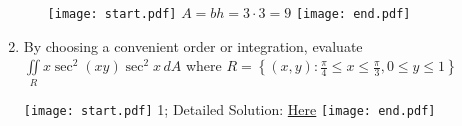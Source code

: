 \documentclass[12pt]{article}
\begin{document}
\begin{enumerate}
\begin{enumerate}
\texttt{[image: start.pdf]}
{{$A=bh=3\cdot3=9$}}
\texttt{[image: end.pdf]}


\end{enumerate}

\item By choosing a convenient order or integration, evaluate $\iint \limits_{R} x\sec^2{(xy)}\sec^2{x} \,dA$ where $R=\left\{(x,y) : \frac{\pi}{4}\leq x \leq \frac{\pi}{3}, 0 \leq y \leq 1\right\}$

\texttt{[image: start.pdf]}
{{1; Detailed Solution: \textcolor{blue}{\href{http://www.math.drexel.edu/classes/Calculus/resources/Math200HW/Solutions/16_200_Double_Int_I_08.pdf}{Here}}}}
\texttt{[image: end.pdf]}


\end{enumerate}
\end{document}

